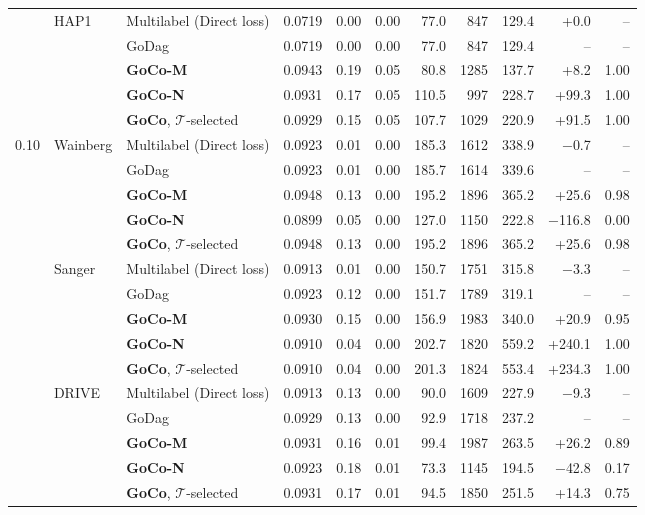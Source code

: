 \begin{table}[htbp]
{\begin{tabular}{lll rrr rrr r r}
 & HAP1 & Multilabel (Direct loss) & 0.0719 & 0.00 & 0.00 & 77.0 & 847 & 129.4 & +0.0 & -- \\
 &  & GoDag & 0.0719 & 0.00 & 0.00 & 77.0 & 847 & 129.4 & -- & -- \\
 &  & \textbf{GoCo-M} & 0.0943 & 0.19 & 0.05 & 80.8 & 1285 & 137.7 & +8.2 & 1.00 \\
 &  & \textbf{GoCo-N} & 0.0931 & 0.17 & 0.05 & 110.5 & 997 & 228.7 & +99.3 & 1.00 \\
 &  & \textbf{GoCo}, $\mathcal T$-selected & 0.0929 & 0.15 & 0.05 & 107.7 & 1029 & 220.9 & +91.5 & 1.00 \\
\midrule
0.10 & Wainberg & Multilabel (Direct loss) & 0.0923 & 0.01 & 0.00 & 185.3 & 1612 & 338.9 & $-$0.7 & -- \\
 &  & GoDag & 0.0923 & 0.01 & 0.00 & 185.7 & 1614 & 339.6 & -- & -- \\
 &  & \textbf{GoCo-M} & 0.0948 & 0.13 & 0.00 & 195.2 & 1896 & 365.2 & +25.6 & 0.98 \\
 &  & \textbf{GoCo-N} & 0.0899 & 0.05 & 0.00 & 127.0 & 1150 & 222.8 & $-$116.8 & 0.00 \\
 &  & \textbf{GoCo}, $\mathcal T$-selected & 0.0948 & 0.13 & 0.00 & 195.2 & 1896 & 365.2 & +25.6 & 0.98 \\
 & Sanger & Multilabel (Direct loss) & 0.0913 & 0.01 & 0.00 & 150.7 & 1751 & 315.8 & $-$3.3 & -- \\
 &  & GoDag & 0.0923 & 0.12 & 0.00 & 151.7 & 1789 & 319.1 & -- & -- \\
 &  & \textbf{GoCo-M} & 0.0930 & 0.15 & 0.00 & 156.9 & 1983 & 340.0 & +20.9 & 0.95 \\
 &  & \textbf{GoCo-N} & 0.0910 & 0.04 & 0.00 & 202.7 & 1820 & 559.2 & +240.1 & 1.00 \\
 &  & \textbf{GoCo}, $\mathcal T$-selected & 0.0910 & 0.04 & 0.00 & 201.3 & 1824 & 553.4 & +234.3 & 1.00 \\
 & DRIVE & Multilabel (Direct loss) & 0.0913 & 0.13 & 0.00 & 90.0 & 1609 & 227.9 & $-$9.3 & -- \\
 &  & GoDag & 0.0929 & 0.13 & 0.00 & 92.9 & 1718 & 237.2 & -- & -- \\
 &  & \textbf{GoCo-M} & 0.0931 & 0.16 & 0.01 & 99.4 & 1987 & 263.5 & +26.2 & 0.89 \\
 &  & \textbf{GoCo-N} & 0.0923 & 0.18 & 0.01 & 73.3 & 1145 & 194.5 & $-$42.8 & 0.17 \\
 &  & \textbf{GoCo}, $\mathcal T$-selected & 0.0931 & 0.17 & 0.01 & 94.5 & 1850 & 251.5 & +14.3 & 0.75 \\

\end{tabular}}
\end{table}

